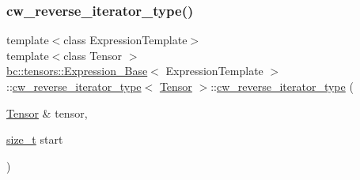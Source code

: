 \subsubsection{\texorpdfstring{cw\+\_\+reverse\+\_\+iterator\+\_\+type()}{cw\_reverse\_iterator\_type()}\hspace{0.1cm}{\footnotesize\ttfamily [2/3]}}
{\footnotesize\ttfamily template$<$class Expression\+Template$>$ \\
template$<$class Tensor $>$ \\
\hyperlink{classbc_1_1tensors_1_1Expression__Base}{bc\+::tensors\+::\+Expression\+\_\+\+Base}$<$ Expression\+Template $>$\+::\hyperlink{structbc_1_1tensors_1_1Expression__Base_1_1cw__reverse__iterator__type}{cw\+\_\+reverse\+\_\+iterator\+\_\+type}$<$ \hyperlink{namespacebc_a659391e47ab612be3ba6c18cf9c89159}{Tensor} $>$\+::\hyperlink{structbc_1_1tensors_1_1Expression__Base_1_1cw__reverse__iterator__type}{cw\+\_\+reverse\+\_\+iterator\+\_\+type} (\begin{DoxyParamCaption}\item[{\hyperlink{namespacebc_a659391e47ab612be3ba6c18cf9c89159}{Tensor} \&}]{tensor,  }\item[{\hyperlink{structbc_1_1tensors_1_1Expression__Base_1_1cw__reverse__iterator__type_a0d2537ccece5626aeb1feef58980f3b6}{size\+\_\+t}}]{start }\end{DoxyParamCaption})\hspace{0.3cm}{\ttfamily [inline]}}

\mbox{\label{structbc_1_1tensors_1_1Expression__Base_1_1cw__reverse__iterator__type_a0772d11b363975f6dbe1ff627efd347a}} 

